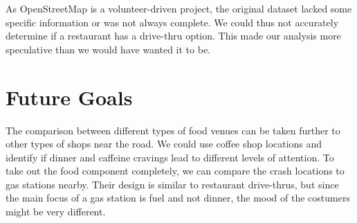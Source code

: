 \documentclass[11pt,a4paper]{article}
\begin{document}
As OpenStreetMap is a volunteer-driven project, the original dataset lacked some specific information or was not always complete. We could thus not accurately determine if a restaurant has a drive-thru option. This made our analysis more speculative than we would have wanted it to be.




\section{Future Goals}

The comparison between different types of food venues can be taken further to other types of shops near the road. We could use coffee shop locations and identify if dinner and caffeine cravings lead to different levels of attention. To take out the food component completely, we can compare the crash locations to gas stations nearby. Their design is similar to restaurant drive-thrus, but since the main focus of a gas station is fuel and not dinner, the mood of the costumers might be very different.
\end{document}
